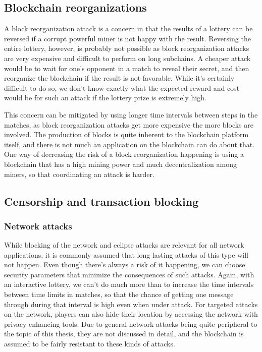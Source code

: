 \subsection{Blockchain reorganizations}

A block reorganization attack is a concern in that the results of a lottery can be reversed if a corrupt powerful miner is not happy with the result. Reversing the entire lottery, however, is probably not possible as block reorganization attacks are very expensive and difficult to perform on long subchains. A cheaper attack would be to wait for one's opponent in a match to reveal their secret, and then reorganize the blockchain if the result is not favorable. While it's certainly difficult to do so, we don't know exactly what the expected reward and cost would be for such an attack if the lottery prize is extremely high.

This concern can be mitigated by using longer time intervals between steps in the matches, as block reorganization attacks get more expensive the more blocks are involved. The production of blocks is quite inherent to the blockchain platform itself, and there is not much an application on the blockchain can do about that. One way of decreasing the risk of a block reorganization happening is using a blockchain that has a high mining power and much decentralization among miners, so that coordinating an attack is harder.

\subsection{Censorship and transaction blocking}

\subsubsection{Network attacks} While blocking of the network and eclipse attacks are relevant for all network applications, it is commonly assumed that long lasting attacks of this type will not happen. Even though there's always a risk of it happening, we can choose security parameters that minimize the consequences of such attacks. Again, with an interactive lottery, we can't do much more than to increase the time intervals between time limits in matches, so that the chance of getting one message through during that interval is high even when under attack. For targeted attacks on the network, players can also hide their location by accessing the network with privacy enhancing tools. Due to general network attacks being quite peripheral to the topic of this thesis, they are not discussed in detail, and the blockchain is assumed to be fairly resistant to these kinds of attacks.

